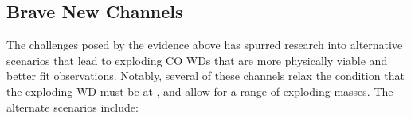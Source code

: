 

\subsection{Brave New Channels}
\label{ssec:c1_new_typeia}


The challenges posed by the evidence above has spurred research into alternative scenarios that lead to exploding CO WDs that are more physically viable and better fit observations.  Notably, several of these channels relax the condition that the exploding WD must be at \Mch, and allow for a range of exploding masses.  The alternate scenarios include:

